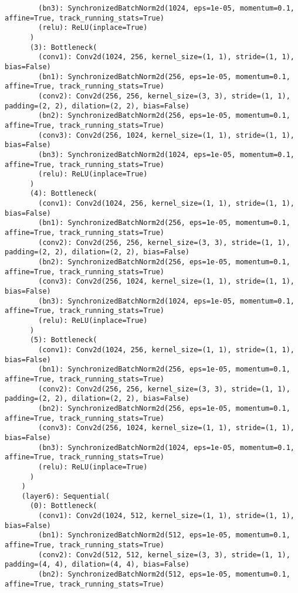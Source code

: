 \begin{verbatim}
        (bn3): SynchronizedBatchNorm2d(1024, eps=1e-05, momentum=0.1, affine=True, track_running_stats=True)
        (relu): ReLU(inplace=True)
      )
      (3): Bottleneck(
        (conv1): Conv2d(1024, 256, kernel_size=(1, 1), stride=(1, 1), bias=False)
        (bn1): SynchronizedBatchNorm2d(256, eps=1e-05, momentum=0.1, affine=True, track_running_stats=True)
        (conv2): Conv2d(256, 256, kernel_size=(3, 3), stride=(1, 1), padding=(2, 2), dilation=(2, 2), bias=False)
        (bn2): SynchronizedBatchNorm2d(256, eps=1e-05, momentum=0.1, affine=True, track_running_stats=True)
        (conv3): Conv2d(256, 1024, kernel_size=(1, 1), stride=(1, 1), bias=False)
        (bn3): SynchronizedBatchNorm2d(1024, eps=1e-05, momentum=0.1, affine=True, track_running_stats=True)
        (relu): ReLU(inplace=True)
      )
      (4): Bottleneck(
        (conv1): Conv2d(1024, 256, kernel_size=(1, 1), stride=(1, 1), bias=False)
        (bn1): SynchronizedBatchNorm2d(256, eps=1e-05, momentum=0.1, affine=True, track_running_stats=True)
        (conv2): Conv2d(256, 256, kernel_size=(3, 3), stride=(1, 1), padding=(2, 2), dilation=(2, 2), bias=False)
        (bn2): SynchronizedBatchNorm2d(256, eps=1e-05, momentum=0.1, affine=True, track_running_stats=True)
        (conv3): Conv2d(256, 1024, kernel_size=(1, 1), stride=(1, 1), bias=False)
        (bn3): SynchronizedBatchNorm2d(1024, eps=1e-05, momentum=0.1, affine=True, track_running_stats=True)
        (relu): ReLU(inplace=True)
      )
      (5): Bottleneck(
        (conv1): Conv2d(1024, 256, kernel_size=(1, 1), stride=(1, 1), bias=False)
        (bn1): SynchronizedBatchNorm2d(256, eps=1e-05, momentum=0.1, affine=True, track_running_stats=True)
        (conv2): Conv2d(256, 256, kernel_size=(3, 3), stride=(1, 1), padding=(2, 2), dilation=(2, 2), bias=False)
        (bn2): SynchronizedBatchNorm2d(256, eps=1e-05, momentum=0.1, affine=True, track_running_stats=True)
        (conv3): Conv2d(256, 1024, kernel_size=(1, 1), stride=(1, 1), bias=False)
        (bn3): SynchronizedBatchNorm2d(1024, eps=1e-05, momentum=0.1, affine=True, track_running_stats=True)
        (relu): ReLU(inplace=True)
      )
    )
    (layer6): Sequential(
      (0): Bottleneck(
        (conv1): Conv2d(1024, 512, kernel_size=(1, 1), stride=(1, 1), bias=False)
        (bn1): SynchronizedBatchNorm2d(512, eps=1e-05, momentum=0.1, affine=True, track_running_stats=True)
        (conv2): Conv2d(512, 512, kernel_size=(3, 3), stride=(1, 1), padding=(4, 4), dilation=(4, 4), bias=False)
        (bn2): SynchronizedBatchNorm2d(512, eps=1e-05, momentum=0.1, affine=True, track_running_stats=True)

\end{verbatim}
